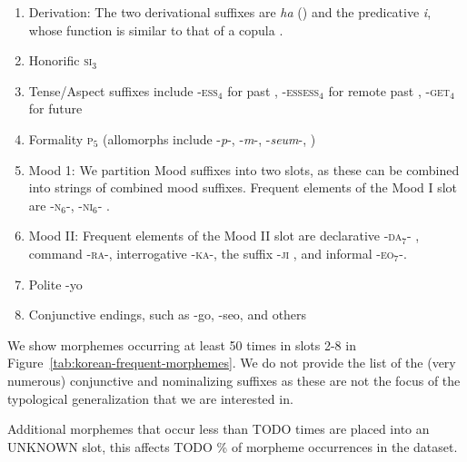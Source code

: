 \begin{enumerate}
    \item Derivation: The two derivational suffixes are \textit{ha} (\citep[4.1.2]{yeon2010korean}) and the predicative \textit{i}, whose function is similar to that of a copula \citep[4.1.4]{yeon2010korean}.
    
    \item Honorific \textsc{si}$_3$ \citep[4.3.2, 4.4.1]{yeon2010korean}
    \item Tense/Aspect suffixes include -\textsc{ess}$_4$ for past \citep[4.5.1.1]{yeon2010korean}, -\textsc{essess}$_4$ for remote past \citep[4.5.1.2]{yeon2010korean}, -\textsc{get}$_4$ for future \citep[4.5.2.1]{yeon2010korean}
    \item Formality \textsc{p}$_5$ (allomorphs include -\textit{p}-, -\textit{m}-, -\textit{seum}-,  \citep[4.3.2]{yeon2010korean})
    \item Mood 1: We partition Mood suffixes into two slots, as these can be combined into strings of combined mood suffixes. Frequent elements of the Mood I slot are -\textsc{n}$_6$-, -\textsc{ni}$_6$- \citep[4.3.2]{yeon2010korean}.
    
    \item Mood II: Frequent elements of the Mood II slot are declarative -\textsc{da}$_7$- \citep[4.3.2]{yeon2010korean}, command -\textsc{ra}-, interrogative -\textsc{ka}-, the suffix  -\textsc{ji} \citep[4.2.2-3]{yeon2010korean}, and informal -\textsc{eo}$_7$-.
    
    \item Polite -yo
    \item Conjunctive endings, such as -go, -seo,  and others
    
\end{enumerate}

We show morphemes occurring at least 50 times in slots 2-8 in Figure~\ref{tab:korean-frequent-morphemes}.
We do not provide the list of the (very numerous) conjunctive and nominalizing suffixes as these are not the focus of the typological generalization that we are interested in.

Additional morphemes that occur less than TODO times are placed into an UNKNOWN slot, this affects TODO \% of morpheme occurrences in the dataset.




